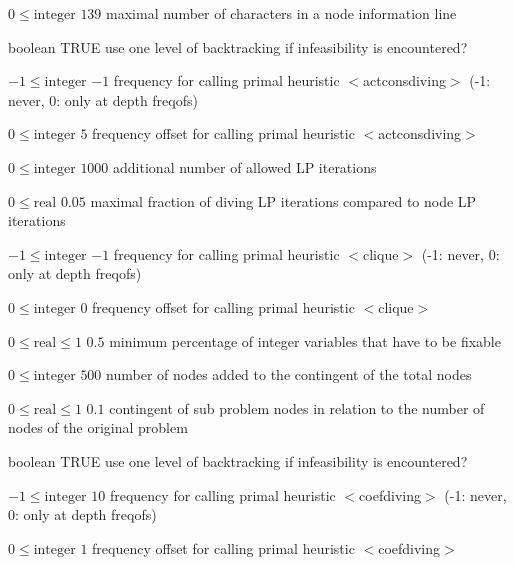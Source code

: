 %
{$0\leq\textrm{integer}$}%
{$139$}%
{maximal number of characters in a node information line}%
{}

%
{boolean}%
{TRUE}%
{use one level of backtracking if infeasibility is encountered?}%
{}

%
{$-1\leq\textrm{integer}$}%
{$-1$}%
{frequency for calling primal heuristic $<$actconsdiving$>$ (-1: never, 0: only at depth freqofs)}%
{}

%
{$0\leq\textrm{integer}$}%
{$5$}%
{frequency offset for calling primal heuristic $<$actconsdiving$>$}%
{}

%
{$0\leq\textrm{integer}$}%
{$1000$}%
{additional number of allowed LP iterations}%
{}

%
{$0\leq\textrm{real}$}%
{$0.05$}%
{maximal fraction of diving LP iterations compared to node LP iterations}%
{}

%
{$-1\leq\textrm{integer}$}%
{$-1$}%
{frequency for calling primal heuristic $<$clique$>$ (-1: never, 0: only at depth freqofs)}%
{}

%
{$0\leq\textrm{integer}$}%
{$0$}%
{frequency offset for calling primal heuristic $<$clique$>$}%
{}

%
{$0\leq\textrm{real}\leq1$}%
{$0.5$}%
{minimum percentage of integer variables that have to be fixable }%
{}

%
{$0\leq\textrm{integer}$}%
{$500$}%
{number of nodes added to the contingent of the total nodes}%
{}

%
{$0\leq\textrm{real}\leq1$}%
{$0.1$}%
{contingent of sub problem nodes in relation to the number of nodes of the original problem}%
{}

%
{boolean}%
{TRUE}%
{use one level of backtracking if infeasibility is encountered?}%
{}

%
{$-1\leq\textrm{integer}$}%
{$10$}%
{frequency for calling primal heuristic $<$coefdiving$>$ (-1: never, 0: only at depth freqofs)}%
{}

%
{$0\leq\textrm{integer}$}%
{$1$}%
{frequency offset for calling primal heuristic $<$coefdiving$>$}%
{}

